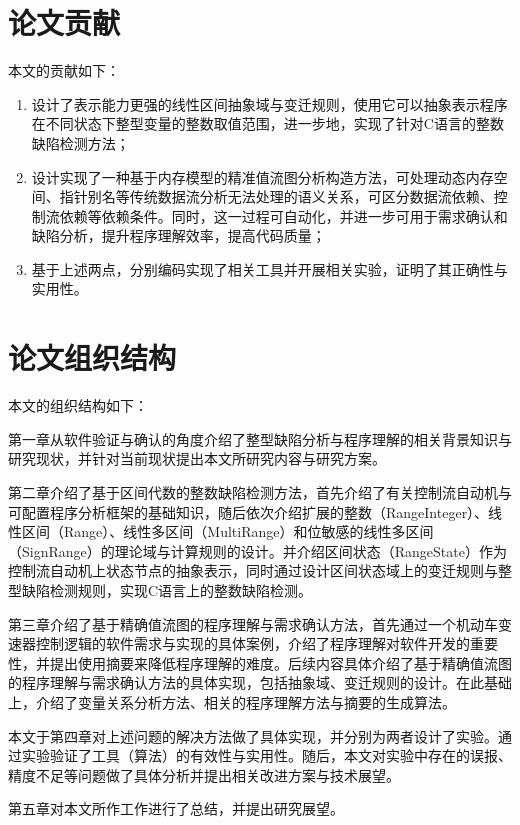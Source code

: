  
 \section{论文贡献}
 
 本文的贡献如下：
 \begin{enumerate}
 	\item 设计了表示能力更强的线性区间抽象域与变迁规则，使用它可以抽象表示程序在不同状态下整型变量的整数取值范围，进一步地，实现了针对C语言的整数缺陷检测方法；
 	
	\item 设计实现了一种基于内存模型的精准值流图分析构造方法，可处理动态内存空间、指针别名等传统数据流分析无法处理的语义关系，可区分数据流依赖、控制流依赖等依赖条件。同时，这一过程可自动化，并进一步可用于需求确认和缺陷分析，提升程序理解效率，提高代码质量；
	
	\item 基于上述两点，分别编码实现了相关工具并开展相关实验，证明了其正确性与实用性。
 \end{enumerate}
 
 \section{论文组织结构}
 
 本文的组织结构如下：
 
 第一章从软件验证与确认的角度介绍了整型缺陷分析与程序理解的相关背景知识与研究现状，并针对当前现状提出本文所研究内容与研究方案。
 
 第二章介绍了基于区间代数的整数缺陷检测方法，首先介绍了有关控制流自动机与可配置程序分析框架的基础知识，随后依次介绍扩展的整数（RangeInteger）、线性区间（Range）、线性多区间（MultiRange）和位敏感的线性多区间（SignRange）的理论域与计算规则的设计。并介绍区间状态（RangeState）作为控制流自动机上状态节点的抽象表示，同时通过设计区间状态域上的变迁规则与整型缺陷检测规则，实现C语言上的整数缺陷检测。
 
 第三章介绍了基于精确值流图的程序理解与需求确认方法，首先通过一个机动车变速器控制逻辑的软件需求与实现的具体案例，介绍了程序理解对软件开发的重要性，并提出使用摘要来降低程序理解的难度。后续内容具体介绍了基于精确值流图的程序理解与需求确认方法的具体实现，包括抽象域、变迁规则的设计。在此基础上，介绍了变量关系分析方法、相关的程序理解方法与摘要的生成算法。
 
本文于第四章对上述问题的解决方法做了具体实现，并分别为两者设计了实验。通过实验验证了工具（算法）的有效性与实用性。随后，本文对实验中存在的误报、精度不足等问题做了具体分析并提出相关改进方案与技术展望。

第五章对本文所作工作进行了总结，并提出研究展望。
 
 
 
 
 
 
 
 
 
 
 
 
 
 
 
 
 
 
 
 
 
 
 
 
 
 
 
 
 
 
 
 
 